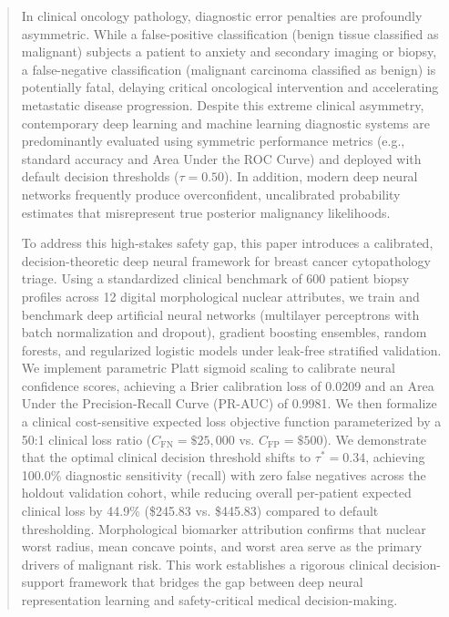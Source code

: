 \documentclass[journal,compsoc]{IEEEtran}
\begin{document}
\begin{abstract}
In clinical oncology pathology, diagnostic error penalties are profoundly asymmetric. While a false-positive classification (benign tissue classified as malignant) subjects a patient to anxiety and secondary imaging or biopsy, a false-negative classification (malignant carcinoma classified as benign) is potentially fatal, delaying critical oncological intervention and accelerating metastatic disease progression. Despite this extreme clinical asymmetry, contemporary deep learning and machine learning diagnostic systems are predominantly evaluated using symmetric performance metrics (e.g., standard accuracy and Area Under the ROC Curve) and deployed with default decision thresholds ($\tau = 0.50$). In addition, modern deep neural networks frequently produce overconfident, uncalibrated probability estimates that misrepresent true posterior malignancy likelihoods.

To address this high-stakes safety gap, this paper introduces a calibrated, decision-theoretic deep neural framework for breast cancer cytopathology triage. Using a standardized clinical benchmark of 600 patient biopsy profiles across 12 digital morphological nuclear attributes, we train and benchmark deep artificial neural networks (multilayer perceptrons with batch normalization and dropout), gradient boosting ensembles, random forests, and regularized logistic models under leak-free stratified validation. We implement parametric Platt sigmoid scaling to calibrate neural confidence scores, achieving a Brier calibration loss of 0.0209 and an Area Under the Precision-Recall Curve (PR-AUC) of 0.9981. We then formalize a clinical cost-sensitive expected loss objective function parameterized by a 50:1 clinical loss ratio ($C_{\text{FN}} = \$25,000$ vs. $C_{\text{FP}} = \$500$). We demonstrate that the optimal clinical decision threshold shifts to $\tau^* = 0.34$, achieving 100.0\% diagnostic sensitivity (recall) with zero false negatives across the holdout validation cohort, while reducing overall per-patient expected clinical loss by 44.9\% (\$245.83 vs. \$445.83) compared to default thresholding. Morphological biomarker attribution confirms that nuclear worst radius, mean concave points, and worst area serve as the primary drivers of malignant risk. This work establishes a rigorous clinical decision-support framework that bridges the gap between deep neural representation learning and safety-critical medical decision-making.
\end{abstract}
\end{document}
